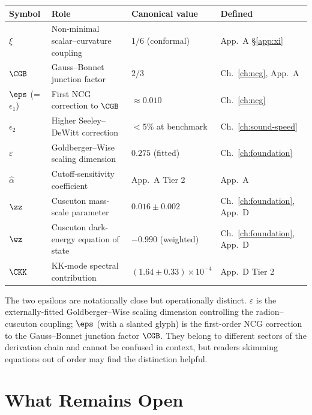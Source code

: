 \begin{center}
\small
\begin{tabular}{@{}llll@{}}
\hline
Symbol & Role & Canonical value & Defined \\
\hline
$\xi$              & Non-minimal scalar--curvature coupling    & $1/6$ (conformal)     & App.~A \S\ref{app:xi} \\
$\CGB$             & Gauss--Bonnet junction factor              & $2/3$                 & Ch.~\ref{ch:ncg}, App.~A \\
$\eps$ (=$\epsilon_1$) & First NCG correction to $\CGB$          & $\approx 0.010$        & Ch.~\ref{ch:ncg} \\
$\epsilon_2$       & Higher Seeley--DeWitt correction           & $<5\%$ at benchmark   & Ch.~\ref{ch:sound-speed} \\
$\varepsilon$      & Goldberger--Wise scaling dimension         & $0.275$ (fitted)      & Ch.~\ref{ch:foundation} \\
$\hat{\alpha}$     & Cutoff-sensitivity coefficient             & App.~A Tier 2          & App.~A \\
$\zz$              & Cuscuton mass-scale parameter              & $0.016 \pm 0.002$     & Ch.~\ref{ch:foundation}, App.~D \\
$\wz$              & Cuscuton dark-energy equation of state     & $-0.990$ (weighted)    & Ch.~\ref{ch:foundation}, App.~D \\
$\CKK$             & KK-mode spectral contribution              & $(1.64 \pm 0.33)\times 10^{-4}$ & App.~D Tier 2 \\
\hline
\end{tabular}
\end{center}

The two epsilons are notationally close but operationally distinct.
$\varepsilon$ is the externally-fitted Goldberger--Wise scaling
dimension controlling the radion--cuscuton coupling; $\eps$ (with a
slanted glyph) is the first-order NCG correction to the Gauss--Bonnet
junction factor $\CGB$. They belong to different sectors of the
derivation chain and cannot be confused in context, but readers
skimming equations out of order may find the distinction helpful.

\section{What Remains Open}
\label{sec:0-open}

